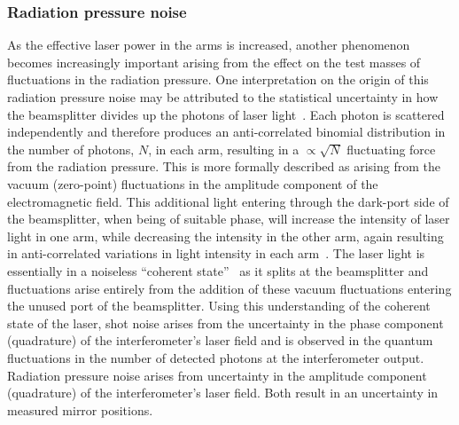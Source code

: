 \subsubsection{Radiation pressure noise}
\label{subsubsection:radiationnoise} 

As the effective laser power in the arms is increased, another phenomenon
becomes increasingly important arising from the effect on the test masses of
fluctuations in the radiation pressure. One interpretation on the origin of this
radiation pressure noise may be attributed to the statistical uncertainty in how
the beamsplitter divides up the photons of laser light~\cite{Edelstein}. Each
photon is scattered independently and therefore produces an anti-correlated
binomial distribution in the number of photons, $N$, in each arm, resulting in a
$\propto\sqrt{N}$ fluctuating force from the radiation pressure. This is more
formally described as arising from the vacuum (zero-point) fluctuations in the
amplitude component of the electromagnetic field. This additional light entering
through the dark-port side of the beamsplitter, when being of suitable phase,
will increase the intensity of laser light in one arm, while decreasing the
intensity in the other arm, again resulting in anti-correlated variations in
light intensity in each arm~\cite{Caves1, Caves2}. The laser light is
essentially in a noiseless ``coherent state''~\cite{Glauber:1963} as it splits
at the beamsplitter and fluctuations arise entirely from the addition
of these vacuum fluctuations entering the unused port of the beamsplitter. Using
this understanding of the coherent state of the laser, shot noise arises from
the uncertainty in the phase component (quadrature) of the interferometer's
laser field and is observed in the quantum fluctuations in the number of
detected photons at the interferometer output. Radiation pressure noise arises
from uncertainty in the amplitude component (quadrature) of the interferometer's
laser field. Both result in an uncertainty in measured mirror positions.


